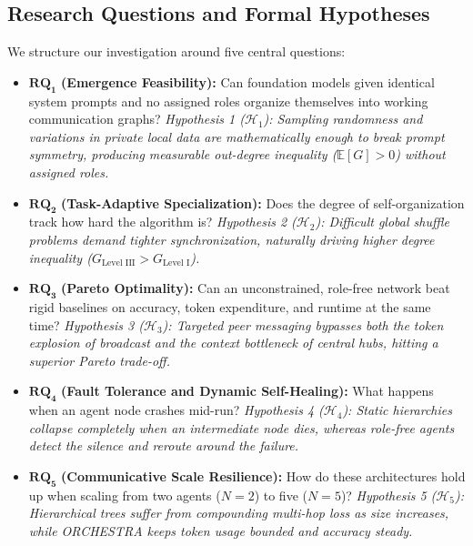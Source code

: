 \documentclass{ieeeaccess}
\begin{document}
\subsection{Research Questions and Formal Hypotheses}
We structure our investigation around five central questions:
\begin{itemize}
    \item $\mathbf{RQ_1}$ \textbf{(Emergence Feasibility):} Can foundation models given identical system prompts and no assigned roles organize themselves into working communication graphs?
    \textit{Hypothesis 1 ($\mathcal{H}_1$): Sampling randomness and variations in private local data are mathematically enough to break prompt symmetry, producing measurable out-degree inequality ($\mathbb{E}[G] > 0$) without assigned roles.}
    \item $\mathbf{RQ_2}$ \textbf{(Task-Adaptive Specialization):} Does the degree of self-organization track how hard the algorithm is?
    \textit{Hypothesis 2 ($\mathcal{H}_2$): Difficult global shuffle problems demand tighter synchronization, naturally driving higher degree inequality ($G_{\text{Level III}} > G_{\text{Level I}}$).}
    \item $\mathbf{RQ_3}$ \textbf{(Pareto Optimality):} Can an unconstrained, role-free network beat rigid baselines on accuracy, token expenditure, and runtime at the same time?
    \textit{Hypothesis 3 ($\mathcal{H}_3$): Targeted peer messaging bypasses both the token explosion of broadcast and the context bottleneck of central hubs, hitting a superior Pareto trade-off.}
    \item $\mathbf{RQ_4}$ \textbf{(Fault Tolerance and Dynamic Self-Healing):} What happens when an agent node crashes mid-run?
    \textit{Hypothesis 4 ($\mathcal{H}_4$): Static hierarchies collapse completely when an intermediate node dies, whereas role-free agents detect the silence and reroute around the failure.}
    \item $\mathbf{RQ_5}$ \textbf{(Communicative Scale Resilience):} How do these architectures hold up when scaling from two agents ($N=2$) to five ($N=5$)?
    \textit{Hypothesis 5 ($\mathcal{H}_5$): Hierarchical trees suffer from compounding multi-hop loss as size increases, while ORCHESTRA keeps token usage bounded and accuracy steady.}
\end{itemize}
\end{document}
